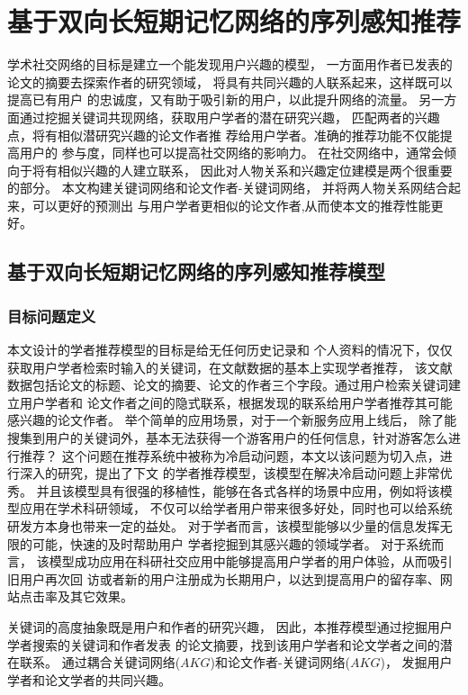 ﻿\chapter{基于双向长短期记忆网络的序列感知推荐}
学术社交网络的目标是建立一个能发现用户兴趣的模型，%
一方面用作者已发表的论文的摘要去探索作者的研究领域，%
将具有共同兴趣的人联系起来，这样既可以提高已有用户%
的忠诚度，又有助于吸引新的用户，以此提升网络的流量。%
另一方面通过挖掘关键词共现网络，获取用户学者的潜在研究兴趣，%
匹配两者的兴趣点，将有相似潜研究兴趣的论文作者推%
荐给用户学者。准确的推荐功能不仅能提高用户的%
参与度，同样也可以提高社交网络的影响力。%
在社交网络中，通常会倾向于将有相似兴趣的人建立联系，%
因此对人物关系和兴趣定位建模是两个很重要的部分。%
本文构建关键词网络和论文作者-关键词网络，%
并将两人物关系网结合起来，可以更好的预测出%
与用户学者更相似的论文作者,从而使本文的推荐性能更好。%

\section{基于双向长短期记忆网络的序列感知推荐模型}
\subsection{目标问题定义}

本文设计的学者推荐模型的目标是给无任何历史记录和%
个人资料的情况下，仅仅获取用户学者检索时输入的关键词，在文献数据的基本上实现学者推荐，%
该文献数据包括论文的标题、论文的摘要、论文的作者三个字段。通过用户检索关键词建立用户学者和%
论文作者之间的隐式联系，根据发现的联系给用户学者推荐其可能感兴趣的论文作者。%
举个简单的应用场景，对于一个新服务应用上线后，%
除了能搜集到用户的关键词外，基本无法获得一个游客用户的任何信息，针对游客怎么进行推荐？%
这个问题在推荐系统中被称为冷启动问题，本文以该问题为切入点，进行深入的研究，提出了下文%
的学者推荐模型，该模型在解决冷启动问题上非常优秀。%
并且该模型具有很强的移植性，能够在各式各样的场景中应用，例如将该模型应用在学术科研领域，%
不仅可以给学者用户带来很多好处，同时也可以给系统研发方本身也带来一定的益处。%
对于学者而言，该模型能够以少量的信息发挥无限的可能，快速的及时帮助用户%
学者挖掘到其感兴趣的领域学者。
对于系统而言，
该模型成功应用在科研社交应用中能够提高用户学者的用户体验，从而吸引旧用户再次回%
访或者新的用户注册成为长期用户，以达到提高用户的留存率、网站点击率及其它效果。

关键词的高度抽象既是用户和作者的研究兴趣，%
因此，本推荐模型通过挖掘用户学者搜索的关键词和作者发表%
的论文摘要，找到该用户学者和论文学者之间的潜在联系。%
通过耦合关键词网络($AKG$)和论文作者-关键词网络($AKG$)，%
发掘用户学者和论文学者的共同兴趣。%

